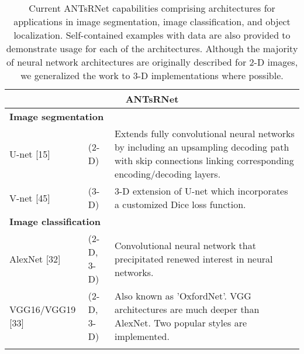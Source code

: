 

\begin{table}[!htb]
\centering
\caption{Current ANTsRNet capabilities comprising architectures for applications in 
image segmentation, image classification, and object localization.  Self-contained
examples with data are also provided to demonstrate usage for each of the architectures.
Although the majority of neural network architectures are originally described
for 2-D images, we generalized the work to 3-D implementations where possible.}
\label{table:antsrnet}
\begin{tabular*}{\textwidth}{ll@{\extracolsep{\fill}}l}
\toprule
\multicolumn{3}{c}{\textbf{ANTsRNet}}    \\        
\midrule
\multicolumn{3}{l}{\textbf{Image segmentation}}
  \vspace{0.25cm} \\ \vspace{0.2cm} 
  U-net [15] & (2-D) & 
    \begin{minipage}[t]{0.6\columnwidth}%
        Extends fully convolutional neural networks by 
        including an upsampling decoding path with skip connections 
        linking corresponding encoding/decoding layers. %
    \end{minipage} \\ \vspace{0.3cm} 
  V-net [45] & (3-D) &
    \begin{minipage}[t]{0.6\columnwidth}%
        3-D extension of U-net which incorporates a customized
        Dice loss function. %
    \end{minipage} \\
\midrule
\multicolumn{3}{l}{\textbf{Image classification}} 
  \vspace{0.25cm} \\ \vspace{0.2cm} 
  AlexNet [32] & (2-D, 3-D) & 
    \begin{minipage}[t]{0.6\columnwidth}%
        Convolutional neural network that precipitated renewed
        interest in neural networks.
    \end{minipage} \\ \vspace{0.2cm} 
  VGG16/VGG19 [33] & (2-D, 3-D) & 
    \begin{minipage}[t]{0.6\columnwidth}%
        Also known as 'OxfordNet'.  VGG architectures are much 
        deeper than AlexNet.  Two popular styles are implemented. %
    \end{minipage} \\ \vspace{0.2cm} 

\end{tabular*}
\end{table}
